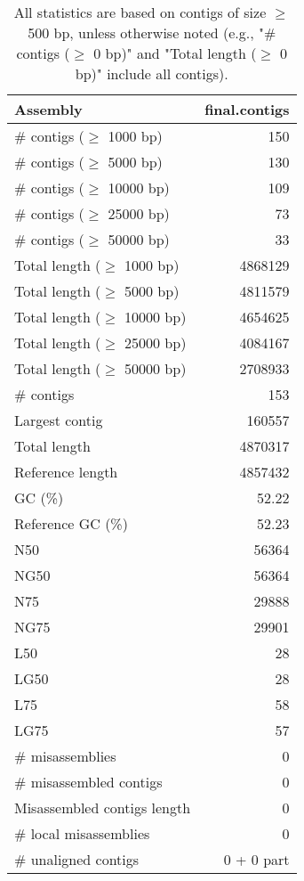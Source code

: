 \documentclass[12pt,a4paper]{article}
\begin{document}
\begin{table}[ht]
\begin{center}
\caption{All statistics are based on contigs of size $\geq$ 500 bp, unless otherwise noted (e.g., "\# contigs ($\geq$ 0 bp)" and "Total length ($\geq$ 0 bp)" include all contigs).}
\begin{tabular}{|l*{1}{|r}|}
\hline
Assembly & final.contigs \\ \hline
\# contigs ($\geq$ 1000 bp) & 150 \\ \hline
\# contigs ($\geq$ 5000 bp) & 130 \\ \hline
\# contigs ($\geq$ 10000 bp) & 109 \\ \hline
\# contigs ($\geq$ 25000 bp) & 73 \\ \hline
\# contigs ($\geq$ 50000 bp) & 33 \\ \hline
Total length ($\geq$ 1000 bp) & 4868129 \\ \hline
Total length ($\geq$ 5000 bp) & 4811579 \\ \hline
Total length ($\geq$ 10000 bp) & 4654625 \\ \hline
Total length ($\geq$ 25000 bp) & 4084167 \\ \hline
Total length ($\geq$ 50000 bp) & 2708933 \\ \hline
\# contigs & 153 \\ \hline
Largest contig & 160557 \\ \hline
Total length & 4870317 \\ \hline
Reference length & 4857432 \\ \hline
GC (\%) & 52.22 \\ \hline
Reference GC (\%) & 52.23 \\ \hline
N50 & 56364 \\ \hline
NG50 & 56364 \\ \hline
N75 & 29888 \\ \hline
NG75 & 29901 \\ \hline
L50 & 28 \\ \hline
LG50 & 28 \\ \hline
L75 & 58 \\ \hline
LG75 & 57 \\ \hline
\# misassemblies & 0 \\ \hline
\# misassembled contigs & 0 \\ \hline
Misassembled contigs length & 0 \\ \hline
\# local misassemblies & 0 \\ \hline
\# unaligned contigs & 0 + 0 part \\ \hline

\end{tabular}
\end{center}
\end{table}
\end{document}
